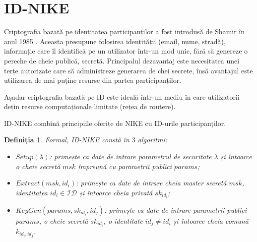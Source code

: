 \documentclass[oneside, 12pt]{book}
\newtheorem{definitie}{\textbf{Definiția}}[section]
\begin{document}
\section{ID-NIKE}
\label{sec:id-nike}

Criptografia bazată pe identitatea participanților a fost introdusă de Shamir în anul 1985 \cite{shamir:1985identity}. Aceasta presupune folosirea identității (email, nume, stradă), informație care îl identifică pe un utilizator într-un mod unic, fără să genereze o pereche de cheie publică, secretă. Principalul dezavantaj este necesitatea unei terțe autorizate care să administreze generarea de chei secrete, însă avantajul este utilizarea de mai puține resurse din partea participanților.

Așadar criptografia bazată pe ID este ideală într-un mediu în care utilizatorii dețin resurse computaționale limitate (rețea de routere).

ID-NIKE combină principiile oferite de NIKE cu ID-urile participanților.
\\
\begin{definitie}
 	Formal, ID-NIKE constă în $3$ algoritmi:
	\begin{itemize}
		\item $Setup(\lambda)$: primește ca date de intrare parametrul de securitate $\lambda$ și întoarce o cheie secretă $msk$ împreună cu parametrii publici $params$;
		\item $Extract(msk, id_i)$: primește ca date de intrare cheia master secretă $msk$, identitatea $id_i \in \mathcal{ID}$ și întoarce cheia privată $sk_{id_i}$;
		\item $KeyGen(params, sk_{id_i}, id_j)$: primește ca date de intrare parametrii publici $params$, o cheie secretă $sk_{id_i}$, o identitate $id_j \neq id_i$ și întoarce cheia comună $k_{id_i, id_j}$.
	\end{itemize}
\end{definitie}

\end{document}
